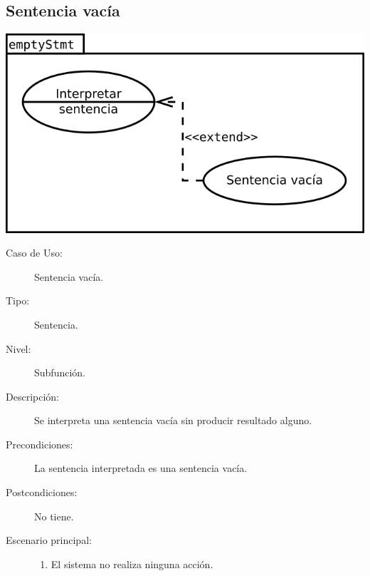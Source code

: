 \subsection {Sentencia vacía}
\begin{center}
\includegraphics[scale=0.4]{emptyStmt.png} \\
\end{center}
\begin{framed}
\FloatBarrier
\begin{description}
   \item[Caso de Uso:]  Sentencia vacía.
   \item [Tipo:] Sentencia.
   \item[Nivel:]  Subfunción.
   \item[Descripción:] 
   Se interpreta una sentencia vacía sin producir resultado alguno.
   \item[Precondiciones:] 
   La sentencia interpretada es una sentencia vacía.
   \item[Postcondiciones:] No tiene.
   \item[Escenario principal:] \hfill
   \begin{enumerate}
   \item El sistema no realiza ninguna acción.
   \end{enumerate}
\end{description}
 \FloatBarrier
\end{framed}
